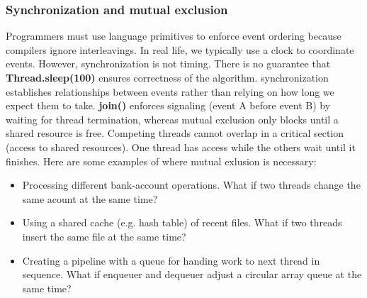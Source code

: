 \documentclass[11pt]{article}
\begin{document}
\subsubsection{Synchronization and mutual exclusion}
Programmers must use language primitives to enforce event ordering because compilers ignore interleavings.
In real life, we typically use a clock to coordinate events. However, synchronization is not timing.
There is no guarantee that \textbf{Thread.sleep(100)} ensures correctness of the algorithm. 
synchronization establishes relationships between events rather than relying on how long we expect them to take.
\textbf{join()} enforces signaling (event A before event B) by waiting for thread termination, whereas mutual exclusion only blocks until a shared resource is free.
Competing threads cannot overlap in a critical section (access to shared resources). One thread has access while the others wait until it finishes.
Here are some examples of where mutual exlusion is necessary:
\begin{itemize}
    \item Processing different bank-account operations. What if two threads change the same acount at the same time?
    \item Using a shared cache (e.g. hash table) of recent files. What if two threads insert the same file at the same time?
    \item Creating a pipeline with a queue for handing work to next thread in sequence. What if enqueuer and dequeuer adjust a circular array queue at the same time? 
\end{itemize}
\end{document}
